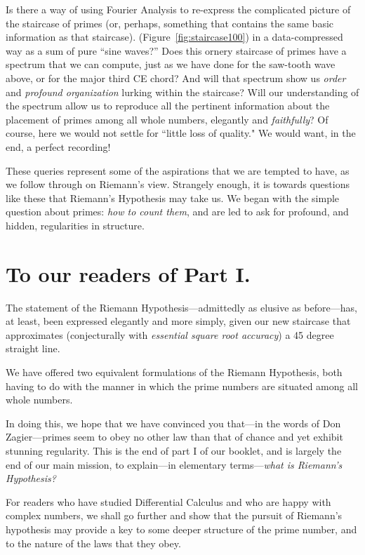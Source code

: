 \documentclass[11pt]{article}
\theoremstyle{plain}
\theoremstyle{definition}
\numberwithin{equation}{section}
\numberwithin{figure}{section}
\numberwithin{table}{section}
\begin{document}
Is there a way of using Fourier Analysis to re-express the complicated
picture of the staircase of primes (or, perhaps, something
  that contains the same basic information as that staircase).
(Figure~\ref{fig:staircase100}) in a data-compressed way as a sum of
pure ``sine waves?''  Does this ornery staircase of primes have a
spectrum that we can compute, just as we have done for the saw-tooth
wave above, or for the major third CE chord?  And will that spectrum
show us {\em order} and {\em profound organization} lurking within the
staircase?  Will our understanding of the spectrum allow us to
reproduce all the pertinent information about the placement of primes
among all whole numbers, elegantly and {\em faithfully}?  Of course,
here we would not settle for ``little loss of quality." We would want,
in the end, a perfect recording!
  
 
These queries represent some of the aspirations that we are tempted to
have, as we follow through on Riemann's view. Strangely enough, it is
towards questions like these that Riemann's Hypothesis may take us. We
began with the simple question about primes: {\em how to count them},
and are led to ask for profound, and hidden, regularities in
structure.

\section{ To our readers of Part I. } 
The statement of the Riemann Hypothesis---admittedly as elusive as
before---has, at least, been expressed elegantly and more simply,
given our new staircase that approximates (conjecturally with {\em
  essential square root accuracy}) a 45 degree straight line.
   
We have offered two equivalent formulations of the Riemann Hypothesis,
both having to do with the manner in which the prime numbers are
situated among all whole numbers.

In doing this, we hope that we have convinced you that---in the words
of Don Zagier---primes seem to obey no other law than that of chance
and yet exhibit stunning regularity.  This is the end of part I of our
booklet, and is largely the end of our main mission, to explain---in
elementary terms---{\em what is Riemann's Hypothesis?}
    
     
For readers who have studied Differential Calculus and who are happy
with complex numbers, we shall go further and show that the pursuit of
Riemann's hypothesis may provide a key to some deeper structure of the
prime number, and to the nature of the laws that they obey.
\end{document}
